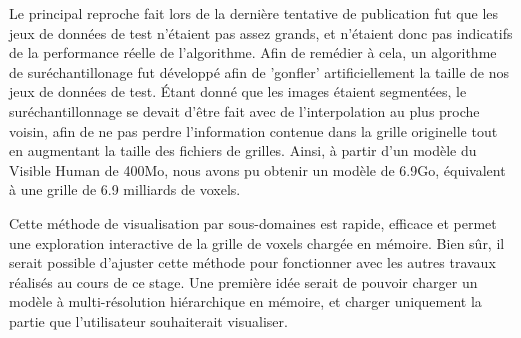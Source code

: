 {{{			Le principal reproche fait lors de la dernière tentative de publication fut que les jeux de données de test n'étaient pas assez grands, et n'étaient donc pas indicatifs de la performance réelle de l'algorithme. Afin de remédier à cela, un algorithme de suréchantillonage fut développé afin de 'gonfler' artificiellement la taille de nos jeux de données de test. Étant donné que les images étaient segmentées, le suréchantillonnage se devait d'être fait avec de l'interpolation au plus proche voisin, afin de ne pas perdre l'information contenue dans la grille originelle tout en augmentant la taille des fichiers de grilles. Ainsi, à partir d'un modèle du Visible Human de 400Mo, nous avons pu obtenir un modèle de 6.9Go, équivalent à une grille de 6.9 milliards de voxels.~
		}

		Cette méthode de visualisation par sous-domaines est rapide, efficace et permet une exploration interactive de la grille de voxels chargée en mémoire. Bien sûr, il serait possible d'ajuster cette méthode pour fonctionner avec les autres travaux réalisés au cours de ce stage. Une première idée serait de pouvoir charger un modèle à multi-résolution hiérarchique en mémoire, et charger uniquement la partie que l'utilisateur souhaiterait visualiser.
	}

}

